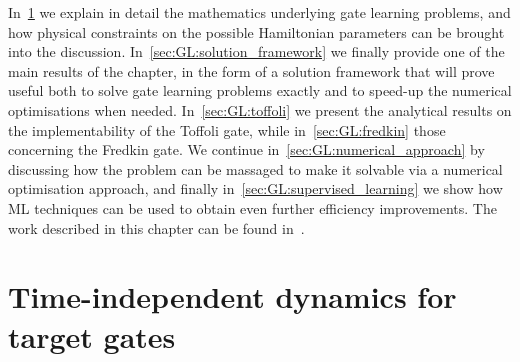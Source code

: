 In~\cref{sec:GL:problem_details} we explain in detail the mathematics underlying gate learning problems, and how physical constraints on the possible Hamiltonian parameters can be brought into the discussion. In~\cref{sec:GL:solution_framework} we finally provide one of the main results of the chapter, in the form of a solution framework that will prove useful both to solve gate learning problems exactly and to speed-up the numerical optimisations when needed. In~\cref{sec:GL:toffoli} we present the analytical results on the implementability of the Toffoli gate, while in~\cref{sec:GL:fredkin} those concerning the Fredkin gate. We continue in~\cref{sec:GL:numerical_approach} by discussing how the problem can be massaged to make it solvable via a numerical optimisation approach, and finally in~\cref{sec:GL:supervised_learning} we show how \ac{ML} techniques can be used to obtain even further efficiency improvements.
The work described in this chapter can be found in~\cite{innocenti2018approximate,innocenti2018supervised}.


\section{Time-independent dynamics for target gates}
\label{sec:GL:problem_details}

\newcommand{\setOfHamiltonians}{\calH[\bullet]}

